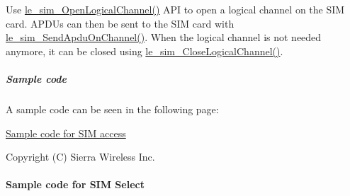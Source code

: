 Use \hyperlink{le__sim__interface_8h_a88e2de9b9079e142b7a11bbb43bd95be}{le\+\_\+sim\+\_\+\+Open\+Logical\+Channel()} A\+PI to open a logical channel on the S\+IM card. A\+P\+D\+Us can then be sent to the S\+IM card with \hyperlink{le__sim__interface_8h_ac6bddf340beb65e2d9bdde307694cbb1}{le\+\_\+sim\+\_\+\+Send\+Apdu\+On\+Channel()}. When the logical channel is not needed anymore, it can be closed using \hyperlink{le__sim__interface_8h_ac3f55bd37c4b1df143bec93883fd1467}{le\+\_\+sim\+\_\+\+Close\+Logical\+Channel()}.\hypertarget{c_sim_le_sim_accessSampleCode}{}\subparagraph{Sample code}\label{c_sim_le_sim_accessSampleCode}
A sample code can be seen in the following page\+:
\begin{DoxyItemize}
\item \hyperlink{c_simTestApdu}{Sample code for S\+IM access}
\end{DoxyItemize}





Copyright (C) Sierra Wireless Inc. \hypertarget{c_simTestSelect}{}\paragraph{Sample code for S\+IM Select}\label{c_simTestSelect}

